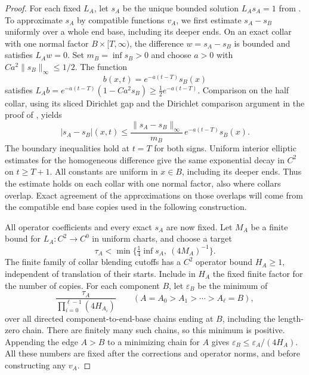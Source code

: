\begin{proof}
For each fixed $L_A$, let $s_A$ be the unique bounded solution
$L_As_A=1$ from . To approximate $s_A$ by
compatible functions $v_A$, we first estimate $s_A-s_B$ uniformly over
a whole end base, including its deeper ends.  On an
exact collar with one normal factor $B\times[T,\infty)$, the difference
$w=s_A-s_B$ is bounded and satisfies $L_Aw=0$.  Set
$m_B=\inf s_B>0$ and choose $a>0$ with
$Ca^2\|s_B\|_\infty\le1/2$.  The function
\[
 b(x,t)=e^{-a(t-T)}s_B(x)
\]
satisfies $L_Ab=e^{-a(t-T)}(1-Ca^2s_B)\ge\tfrac12e^{-a(t-T)}$.
Comparison on the half collar, using its sliced Dirichlet gap and
the Dirichlet comparison argument in the proof of
, yields
\begin{equation}\label{regular:end-decay}
 |s_A-s_B|(x,t)\le
 \frac{\|s_A-s_B\|_\infty}{m_B}\,
 e^{-a(t-T)}s_B(x).
\end{equation}
The boundary inequalities hold at $t=T$ for both signs.  Uniform
interior elliptic estimates for the homogeneous difference give the
same exponential decay in $C^2$ on $t\ge T+1$.  All constants are
uniform in $x\in B$, including its deeper ends.  Thus the estimate holds
on each collar with one normal factor, also where collars overlap.  Exact agreement
of the approximations on those overlaps will come from the compatible
end base copies used in the following construction.

All operator coefficients and every exact $s_A$ are now fixed.  Let
$M_A$ be a finite bound for $L_A:C^2\to C^0$ in uniform charts, and
choose a target
\[
 \tau_A<\min\{\tfrac14\inf s_A,\ (4M_A)^{-1}\}.
\]
The finite family of collar blending cutoffs has a $C^2$ operator
bound $H_A\ge1$, independent of translation of their starts.  Include in $H_A$ the fixed finite factor for the number of copies.
For each component $B$, let $\varepsilon_B$ be the minimum of
\[
 \frac{\tau_A}{\prod_{i=0}^{\ell-1}(4H_{A_i})}
 \qquad
 (A=A_0>A_1>\cdots>A_\ell=B),
\]
over all directed component-to-end-base chains ending at $B$, including the
length-zero chain. There are finitely many such chains, so this
minimum is positive. Appending the edge $A>B$ to a minimizing chain
for $A$ gives $\varepsilon_B\le\varepsilon_A/(4H_A)$.
All these numbers are fixed after the corrections and operator norms,
and before constructing any $v_A$.


\end{proof}
